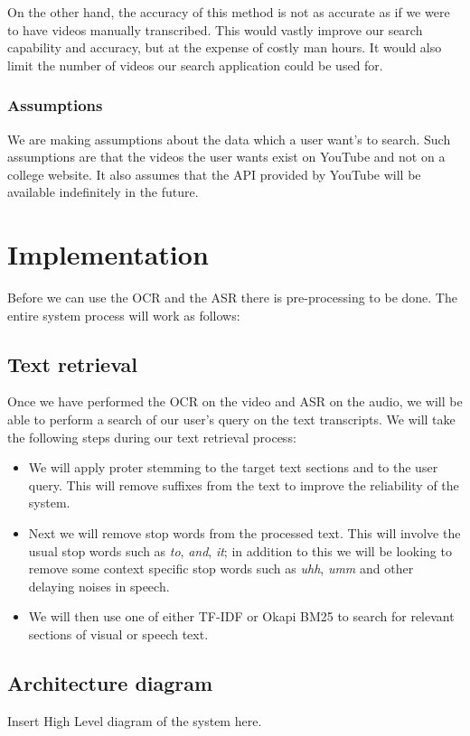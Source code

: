 \documentclass[a4paper,12pt]{article}
\begin{document}
On the other hand, the accuracy of this method is not as accurate as if we were to have videos manually transcribed. This would vastly improve our search capability and accuracy, but at the expense of costly man hours. It would also limit the number of videos our search application could be used for.

\subsubsection{Assumptions}
We are making assumptions about the data which a user want's to search. Such assumptions are that the videos the user wants exist on YouTube and not on a college website. It also assumes that the API provided by YouTube will be available indefinitely in the future.

\section{Implementation}
Before we can use the OCR and the ASR there is pre-processing to be done. The entire system process will work as follows:

\subsection{Text retrieval}
Once we have performed the OCR on the video and ASR on the audio, we will be able to perform a search of our user's query on the text transcripts. We will take the following steps during our text retrieval process:

\begin{itemize}
\item
We will apply proter stemming to the target text sections and to the user query. This will remove suffixes from the text to improve the reliability of the system.

\item
Next we will remove stop words from the processed text. This will involve the usual stop words such as \textit{to}, \textit{and}, \textit{it}; in addition to this we will be looking to remove some context specific stop words such as \textit{uhh}, \textit{umm} and other delaying noises in speech.

\item
We will then use one of either TF-IDF or Okapi BM25 to search for relevant sections of visual or speech text.
\end{itemize}

\subsection{Architecture diagram}
Insert High Level diagram of the system here.
\end{document}
